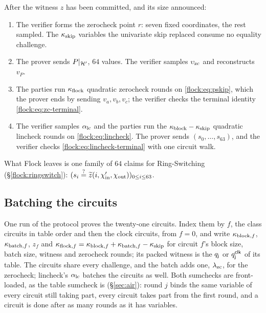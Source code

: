 \begin{protocol}\label{flock:protocol}
After the witness $z$ has been committed, and its size announced:
\begin{enumerate}
\item The verifier forms the zerocheck point $r$: seven fixed coordinates, the rest sampled. The $\kappa_{\mathrm{skip}}$ variables the univariate skip replaced consume no equality challenge.
\item The prover sends $P|_{\mathcal{H}'}$, $64$ values. The verifier samples $\upsilon_{\mathrm{zc}}$ and reconstructs $v_P$.
\item The parties run $\kappa_{\mathrm{flock}}$ quadratic zerocheck rounds on \eqref{flock:eq:pskip}, which the prover ends by sending $v_a,v_b,v_c$; the verifier checks the terminal identity \eqref{flock:eq:zc-terminal}.
\item The verifier samples $\alpha_{\mathrm{lc}}$ and the parties run the $\kappa_{\mathrm{block}}-\kappa_{\mathrm{skip}}$ quadratic lincheck rounds on \eqref{flock:eq:lincheck}. The prover sends $(s_0,\ldots,s_{63})$, and the verifier checks \eqref{flock:eq:lincheck-terminal} with one circuit walk.
\end{enumerate}
What Flock leaves is one family of $64$ claims for Ring-Switching (\S\ref{flock:ringswitch}): $(s_i \stackrel{?}{=} \widetilde{z}(i, \chi'_{\mathrm{in}},\chi_{\mathrm{out}}))_{0 \leq i \leq 63}$.
\end{protocol}

\subsection{Batching the circuits}\label{flock:batch}

One run of the protocol proves the twenty-one circuits. Index them by $f$, the class circuits in table order and then the clock circuits, from $f=0$, and write $\kappa_{\mathrm{block},f}$, $\kappa_{\mathrm{batch},f}$, $z_f$ and $\kappa_{\mathrm{flock},f}=\kappa_{\mathrm{block},f}+\kappa_{\mathrm{batch},f}-\kappa_{\mathrm{skip}}$ for circuit $f$'s block size, batch size, witness and zerocheck rounds; its packed witness is the $q_{\mathsf{j}}$ or $q^{\mathsf{clk}}_{\mathsf{j}}$ of its table. The circuits share every challenge, and the batch adds one, $\lambda_{\mathrm{zc}}$, for the zerocheck; lincheck's $\alpha_{\mathrm{lc}}$ batches the circuits as well. Both sumchecks are front-loaded, as the table sumcheck is (\S\ref{sec:air}): round $j$ binds the same variable of every circuit still taking part, every circuit takes part from the first round, and a circuit is done after as many rounds as it has variables.

